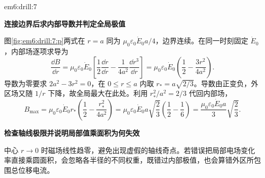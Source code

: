 \begin{drillsolution}{em6:drill:7}
\par\medskip{}\noindent\textbf{连接边界后求内部导数并判定全局极值}\par\nobreak
图\ref{fig:em6:drill:7:p}两式在 $r=a$ 同为 $\mu_0\varepsilon_0\dot E_0a/4$，边界连续。在同一时刻固定 $\dot E_0$，内部场逐项求导为
\[
 \frac{\dd B}{\dd r}=\mu_0\varepsilon_0\dot E_0
 \left[\frac12\frac{\dd r}{\dd r}-\frac1{4a^2}\frac{\dd r^3}{\dd r}\right]
 =\mu_0\varepsilon_0\dot E_0\left(\frac12-\frac{3r^2}{4a^2}\right).
\]
导数为零要求 $2a^2-3r^2=0$，在 $0\le r\le a$ 内取 $r_*=a\sqrt{2/3}$。导数由正变负，外区场又随 $1/r$ 下降，故全局最大在此处。利用 $r_*^2/a^2=2/3$ 代回内部场，
\[
 B_{\max}=\mu_0\varepsilon_0\dot E_0r_*
 \left(\frac12-\frac{r_*^2}{4a^2}\right)
 =\mu_0\varepsilon_0\dot E_0a\sqrt{\frac23}\left(\frac12-\frac16\right)
 =\frac{\mu_0\varepsilon_0\dot E_0a}{3}\sqrt{\frac23}.
\]



\par\medskip{}\noindent\textbf{检查轴线极限并说明局部值乘面积为何失效}\par\nobreak
中心 $r\to0$ 时磁场线性趋零，避免出现虚假的轴线奇点。若错误把局部电场变化率直接乘圆面积，会忽略各半径的不同权重，既错过内部极值，也会算错外区所包围总位移电流。\end{drillsolution}
